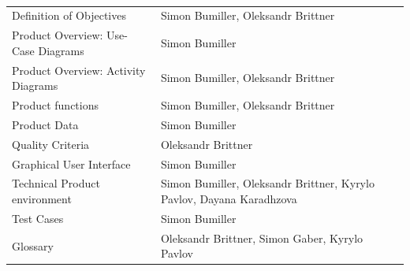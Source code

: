 {}\\[5ex]

\begin{tabular}{p{8cm}p{8cm}}
    Definition of Objectives & Simon Bumiller, Oleksandr Brittner \\[0.4em]
    Product Overview: Use-Case Diagrams & Simon Bumiller \\[0.4em]
    Product Overview: Activity Diagrams & Simon Bumiller, Oleksandr Brittner \\[0.4em]
    Product functions & Simon Bumiller, Oleksandr Brittner \\[0.4em]
    Product Data & Simon Bumiller\\[0.4em]
    Quality Criteria & Oleksandr Brittner \\[0.4em]
    Graphical User Interface & Simon Bumiller \\[0.4em]
    Technical Product environment & Simon Bumiller, Oleksandr Brittner, Kyrylo Pavlov, Dayana Karadhzova\\[2.0em]
    Test Cases & Simon Bumiller\\[0.4em]
    Glossary & Oleksandr Brittner, Simon Gaber, Kyrylo Pavlov
\end{tabular}